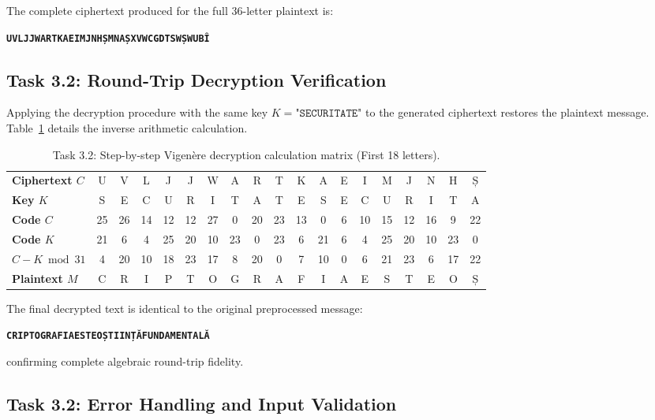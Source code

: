 \documentclass{labreport}
\begin{document}
\noindent
The complete ciphertext produced for the full 36-letter plaintext is:
\begin{center}
    \texttt{\textbf{UVLJJWARTKAEIMJNHȘMNAȘXVWCGDTSWȘWUBÎ}}
\end{center}

\subsection{Task 3.2: Round-Trip Decryption Verification}

Applying the decryption procedure with the same key $K = \texttt{"SECURITATE"}$ to the generated ciphertext restores the plaintext message. Table~\ref{tab:dec_table} details the inverse arithmetic calculation.

\begin{table}[H]
\centering
\scriptsize
\setlength{\tabcolsep}{3.2pt}
\caption{Task 3.2: Step-by-step Vigenère decryption calculation matrix (First 18 letters).}
\label{tab:dec_table}
\begin{tabular}{lcccccccccccccccccc}
\toprule
\textbf{Ciphertext $C$}& U & V & L & J & J & W & A & R & T & K & A & E & I & M & J & N & H & Ș \\
\textbf{Key $K$}       & S & E & C & U & R & I & T & A & T & E & S & E & C & U & R & I & T & A \\
\midrule
\textbf{Code $C$}      & 25 & 26 & 14 & 12 & 12 & 27 & 0 & 20 & 23 & 13 & 0 & 6 & 10 & 15 & 12 & 16 & 9 & 22 \\
\textbf{Code $K$}      & 21 & 6 & 4 & 25 & 20 & 10 & 23 & 0 & 23 & 6 & 21 & 6 & 4 & 25 & 20 & 10 & 23 & 0 \\
\midrule
\textbf{$C-K \bmod 31$}& 4 & 20 & 10 & 18 & 23 & 17 & 8 & 20 & 0 & 7 & 10 & 0 & 6 & 21 & 23 & 6 & 17 & 22 \\
\textbf{Plaintext $M$} & C & R & I & P & T & O & G & R & A & F & I & A & E & S & T & E & O & Ș \\
\bottomrule
\end{tabular}
\end{table}

\noindent
The final decrypted text is identical to the original preprocessed message:
\begin{center}
    \texttt{\textbf{CRIPTOGRAFIAESTEOȘTIINȚĂFUNDAMENTALĂ}}
\end{center}
confirming complete algebraic round-trip fidelity.

\subsection{Task 3.2: Error Handling and Input Validation}
\end{document}
